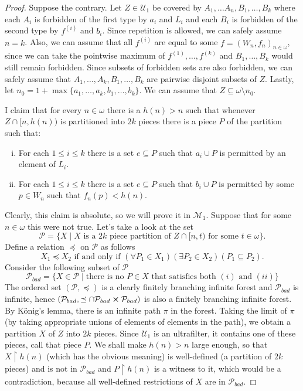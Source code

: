 \documentclass[12pt]{article}\usepackage[english]{babel}
\newcommand{\calM}{\mathcal{M}}
\newcommand{\calP}{\mathcal{P}}
\newcommand{\calU}{\mathcal{U}}
\theoremstyle{definition}
\theoremstyle{remark}
\begin{document}
\begin{proof}
  Suppose the contrary.
  Let $Z \in \calU_1$ be covered by $A_1, \dots A_n, B_1, \dots, B_k$ where each $A_i$ is forbidden of the first type by $a_i$ and $L_i$ and each $B_i$ is forbidden of the second type by $f^{(i)}$ and $b_i$.
  Since repetition is allowed, we can safely assume $n = k$.
  Also, we can assume that all $f^{(i)}$ are equal to some $f = (W_n, f_n)_{n \in \omega}$, since we can take the pointwise maximum of $f^{(1)}, \dots, f^{(k)}$ and $B_1, \dots, B_k$ would still remain forbidden.
  Since subsets of forbidden sets are also forbidden, we can safely assume that $A_1, \dots, A_k, B_1, \dots, B_k$ are pairwise disjoint subsets of $Z$.
  Lastly, let $n_0 = 1 + \max \{ a_1, \dots, a_k, b_1, \dots, b_k \}$.
  We can assume that $Z \subseteq \omega \setminus n_0$.

  I claim that for every $n \in \omega$ there is a $h(n) > n$ such that whenever $Z \cap [n, h(n))$ is partitioned into $2k$ pieces there is a piece $P$ of the partition such that:
  \begin{enumerate}[(i)]
    \item For each $1 \leq i \leq k$ there is a set $e \subseteq P$ such that $a_i \cup P$ is permitted by an element of $L_i$.
    \item For each $1 \leq i \leq k$ there is a set $e \subseteq P$ such that $b_i \cup P$ is permitted by some $p \in W_n$ such that $f_n(p) < h(n)$.
  \end{enumerate}
  Clearly, this claim is absolute, so we will prove it in $\calM_1$.
  Suppose that for some $n \in \omega$ this were not true.
  Let's take a look at the set
  \[
    \calP = \{ X \mid X \text{ is a } 2k \text{ piece partition of } Z \cap [n, t) \text{ for some } t \in \omega \}.
  \]
  Define a relation $\preceq$ on $\calP$ as follows
  \[
    X_1 \preceq X_2 \text{ if and only if } (\forall P_1 \in X_1) (\exists P_2 \in X_2) (P_1 \subseteq P_2).
  \]
  Consider the following subset of $\calP$
  \[
    \calP_{bad} = \{ X \in \calP \mid \text{there is no } P \in X \text{ that satisfies both } (i) \text{ and } (ii) \}
  \]
  The ordered set $(\calP, \preceq)$ is a clearly finitely branching infinite forest and $\calP_{bad}$ is infinite, hence $(\calP_{bad}, \preceq \cap \calP_{bad} \cross \calP_{bad})$ is also a finitely branching infinite forest.
  By König's lemma, there is an infinite path $\pi$ in the forest.
  Taking the limit of $\pi$ (by taking appropriate unions of elements of elements in the path), we obtain a partition $X$ of $Z$ into $2k$ pieces.
  Since $\calU_1$ is an ultrafilter, it contains one of these pieces, call that piece $P$.
  We shall make $h(n) > n$ large enough, so that $X \restriction h(n)$ (which has the obvious meaning) is well-defined (a partition of $2k$ pieces) and is not in $\calP_{bad}$ and $P \restriction h(n)$ is a witness to it, which would be a contradiction, because all well-defined restrictions of $X$ are in $\calP_{bad}$.


\end{proof}
\end{document}
